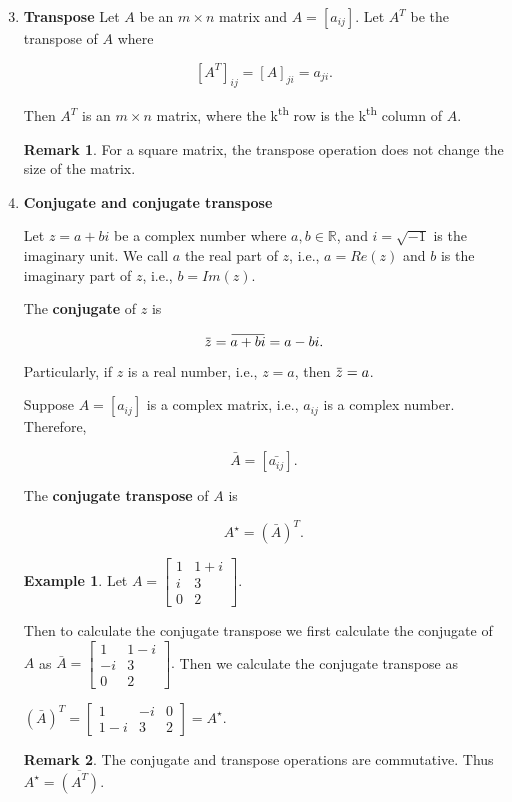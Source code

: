 \documentclass[12pt]{article}
\newcommand{\overbar}[1]{\mkern 1.5mu\overline{\mkern-1.5mu#1\mkern-1.5mu}\mkern 1.5mu}
\theoremstyle{definition}
\newtheorem*{example}{Example}
\newtheorem*{remark}{Remark}
\begin{document}
\begin{enumerate}
\setcounter{enumi}{2}
\item \textbf{Transpose} Let $A$ be an $m \times n$ matrix and $A = [a_{ij}]$. Let $A^T$
be the transpose of $A$ where

\[
\left[ A^T \right]_{ij} = \left[ A \right]_{ji} = a_{ji}.
\]

Then $A^T$ is an $m \times n$ matrix, where the k\textsuperscript{th} row is the
k\textsuperscript{th} column of $A$.

\begin{remark}
For a square matrix, the transpose operation does not change the size of the matrix.
\end{remark}

\item \textbf{Conjugate and conjugate transpose}

Let $z = a + bi$ be a complex number where $a, b \in \mathbb{R}$, and $i = \sqrt{-1}$ is
the imaginary unit. We call $a$ the real part of $z$, i.e., $a = Re(z)$ and $b$ is
the imaginary part of $z$, i.e., $b = Im(z)$.

The \textbf{conjugate} of $z$ is

\[
\overbar{z} = \overbar{a + bi} = a - bi.
\]

Particularly, if $z$ is a real number, i.e., $z = a$, then $\overbar{z} = a$.

Suppose $A = [a_{ij}]$ is a complex matrix, i.e., $a_{ij}$ is a complex number. Therefore,

$$ \bar{A} = \left[ \bar{a_{ij}} \right]. $$


The \textbf{conjugate transpose} of $A$ is 

$$ A^{\star} = ( \bar{A} )^T. $$


\begin{example}
Let 
$ A =
\begin{bmatrix}
1 & 1 + i \\
i & 3 \\
0 & 2
\end{bmatrix}.
$

Then to calculate the conjugate transpose we first calculate the conjugate of $A$ as
$
\bar{A} =
\begin{bmatrix}
1 & 1 - i \\
-i & 3 \\
0 & 2
\end{bmatrix}.
$
Then we calculate the conjugate transpose as

$
(\bar{A})^T =
\begin{bmatrix}
1 & -i & 0 \\
1-i & 3 & 2
\end{bmatrix}
= A^{\star}
$.

\begin{remark}
The conjugate and transpose operations are commutative. Thus
$A^{\star} = \overline{(A^T)}$.
\end{remark}

\end{example}

\end{enumerate}
\end{document}
